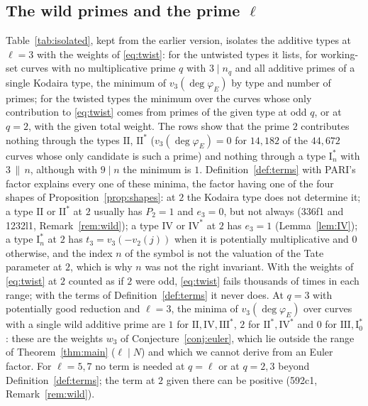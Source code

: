 \documentclass[11pt]{amsart}
\theoremstyle{definition}
\newcommand{\degphi}{\deg\varphi_E}
\begin{document}
\subsection{The wild primes and the prime \texorpdfstring{$\ell$}{l}}\label{sec:wild}
Table~\ref{tab:isolated}, kept from the earlier version, isolates the additive types at $\ell=3$ with the weights of \eqref{eq:twist}: for the untwisted types it lists, for working-set curves with no multiplicative prime $q$ with $3\mid n_q$ and all additive primes of a single Kodaira type, the minimum of $v_3(\degphi)$ by type and number of primes; for the twisted types the minimum over the curves whose only contribution to \eqref{eq:twist} comes from primes of the given type at odd $q$, or at $q=2$, with the given total weight. The rows show that the prime $2$ contributes nothing through the types $\mathrm{II}$, $\mathrm{II}^*$ ($v_3(\degphi)=0$ for $14{,}182$ of the $44{,}672$ curves whose only candidate is such a prime) and nothing through a type $\mathrm{I}_n^*$ with $3\,\|\,n$, although with $9\mid n$ the minimum is $1$. Definition~\ref{def:terms} with PARI's factor explains every one of these minima, the factor having one of the four shapes of Proposition~\ref{prop:shapes}: at $2$ the Kodaira type does not determine it; a type $\mathrm{II}$ or $\mathrm{II}^*$ at $2$ usually has $P_2=1$ and $e_3=0$, but not always (336f1 and 1232l1, Remark~\ref{rem:wild}); a type $\mathrm{IV}$ or $\mathrm{IV}^*$ at $2$ has $e_3=1$ (Lemma~\ref{lem:IV}); a type $\mathrm{I}_n^*$ at $2$ has $t_3=v_3(-v_2(j))$ when it is potentially multiplicative and $0$ otherwise, and the index $n$ of the symbol is not the valuation of the Tate parameter at $2$, which is why $n$ was not the right invariant. With the weights of \eqref{eq:twist} at $2$ counted as if $2$ were odd, \eqref{eq:twist} fails thousands of times in each range; with the terms of Definition~\ref{def:terms} it never does. At $q=3$ with potentially good reduction and $\ell=3$, the minima of $v_3(\degphi)$ over curves with a single wild additive prime are $1$ for $\mathrm{II},\mathrm{IV},\mathrm{III}^*$, $2$ for $\mathrm{II}^*,\mathrm{IV}^*$ and $0$ for $\mathrm{III},\mathrm{I}_0^*$: these are the weights $w_3$ of Conjecture~\ref{conj:euler}, which lie outside the range of Theorem~\ref{thm:main} ($\ell\mid N$) and which we cannot derive from an Euler factor. For $\ell=5,7$ no term is needed at $q=\ell$ or at $q=2,3$ beyond Definition~\ref{def:terms}; the term at $2$ given there can be positive (592c1, Remark~\ref{rem:wild}).

\begin{table}[ht]
\centering\small

\caption{Minimum of $v_3(\degphi)$ (number of curves) over working-set curves with $E[3]$ irreducible whose only possible contributions at $3$ come from the primes named in the row, with the given number of primes (untwisted rows) or total weight of \eqref{eq:twist} (twisted rows).}\label{tab:isolated}
\end{table}
\end{document}
